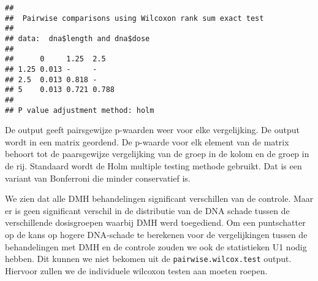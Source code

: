 \documentclass[
  12pt,dutch,coursenotes]{book}
\newenvironment{Shaded}{\begin{snugshade}}{\end{snugshade}}
\newcommand{\ControlFlowTok}[1]{\textcolor[rgb]{0.13,0.29,0.53}{\textbf{#1}}}
\newcommand{\DataTypeTok}[1]{\textcolor[rgb]{0.13,0.29,0.53}{#1}}
\newcommand{\DecValTok}[1]{\textcolor[rgb]{0.00,0.00,0.81}{#1}}
\newcommand{\KeywordTok}[1]{\textcolor[rgb]{0.13,0.29,0.53}{\textbf{#1}}}
\newcommand{\NormalTok}[1]{#1}
\newcommand{\OperatorTok}[1]{\textcolor[rgb]{0.81,0.36,0.00}{\textbf{#1}}}
\newcommand{\StringTok}[1]{\textcolor[rgb]{0.31,0.60,0.02}{#1}}
\theoremstyle{definition}
\theoremstyle{definition}
\theoremstyle{definition}
\theoremstyle{remark}
\begin{document}
\begin{verbatim}
## 
##  Pairwise comparisons using Wilcoxon rank sum exact test 
## 
## data:  dna$length and dna$dose 
## 
##      0     1.25  2.5  
## 1.25 0.013 -     -    
## 2.5  0.013 0.818 -    
## 5    0.013 0.721 0.788
## 
## P value adjustment method: holm
\end{verbatim}

De output geeft pairsgewijze p-waarden weer voor elke vergelijking. De output wordt in een matrix geordend.
De p-waarde voor elk element van de matrix behoort tot de paarsgewijze vergelijking van de groep in de kolom en de groep in de rij.
Standaard wordt de Holm multiple testing methode gebruikt. Dat is een variant van Bonferroni die minder conservatief is.

We zien dat alle DMH behandelingen significant verschillen van de controle.
Maar er is geen significant verschil in de distributie van de DNA schade tussen de verschillende dosisgroepen waarbij DMH werd toegediend.
Om een puntschatter op de kans op hogere DNA-schade te berekenen voor de vergelijkingen tussen de behandelingen met DMH en de controle zouden we ook de statistieken U1 nodig hebben.
Dit kunnen we niet bekomen uit de \texttt{pairwise.wilcox.test} output.
Hiervoor zullen we de individuele wilcoxon testen aan moeten roepen.

\begin{Shaded}
\end{Shaded}
\end{document}
